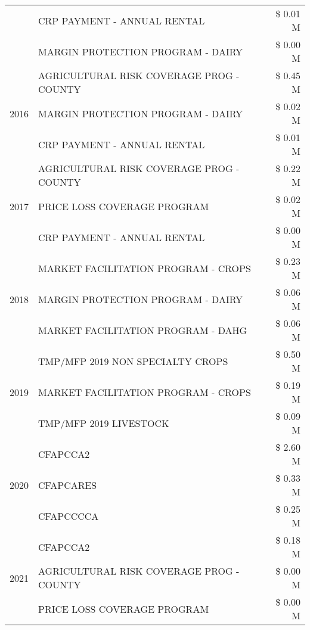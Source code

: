 \begin{tabular}{llr}
 & CRP PAYMENT - ANNUAL RENTAL & \$ 0.01 M \\
 & MARGIN PROTECTION PROGRAM - DAIRY & \$ 0.00 M \\
\cline{1-3}
\multirow[t]{3}{*}{2016} & AGRICULTURAL RISK COVERAGE PROG - COUNTY & \$ 0.45 M \\
 & MARGIN PROTECTION PROGRAM - DAIRY & \$ 0.02 M \\
 & CRP PAYMENT - ANNUAL RENTAL & \$ 0.01 M \\
\cline{1-3}
\multirow[t]{3}{*}{2017} & AGRICULTURAL RISK COVERAGE PROG - COUNTY & \$ 0.22 M \\
 & PRICE LOSS COVERAGE PROGRAM & \$ 0.02 M \\
 & CRP PAYMENT - ANNUAL RENTAL & \$ 0.00 M \\
\cline{1-3}
\multirow[t]{3}{*}{2018} & MARKET FACILITATION PROGRAM - CROPS & \$ 0.23 M \\
 & MARGIN PROTECTION PROGRAM - DAIRY & \$ 0.06 M \\
 & MARKET FACILITATION PROGRAM - DAHG & \$ 0.06 M \\
\cline{1-3}
\multirow[t]{3}{*}{2019} & TMP/MFP 2019 NON SPECIALTY CROPS & \$ 0.50 M \\
 & MARKET FACILITATION PROGRAM - CROPS & \$ 0.19 M \\
 & TMP/MFP 2019 LIVESTOCK & \$ 0.09 M \\
\cline{1-3}
\multirow[t]{3}{*}{2020} & CFAPCCA2 & \$ 2.60 M \\
 & CFAPCARES & \$ 0.33 M \\
 & CFAPCCCCA & \$ 0.25 M \\
\cline{1-3}
\multirow[t]{3}{*}{2021} & CFAPCCA2 & \$ 0.18 M \\
 & AGRICULTURAL RISK COVERAGE PROG - COUNTY & \$ 0.00 M \\
 & PRICE LOSS COVERAGE PROGRAM & \$ 0.00 M \\
\cline{1-3}
\bottomrule
\end{tabular}
